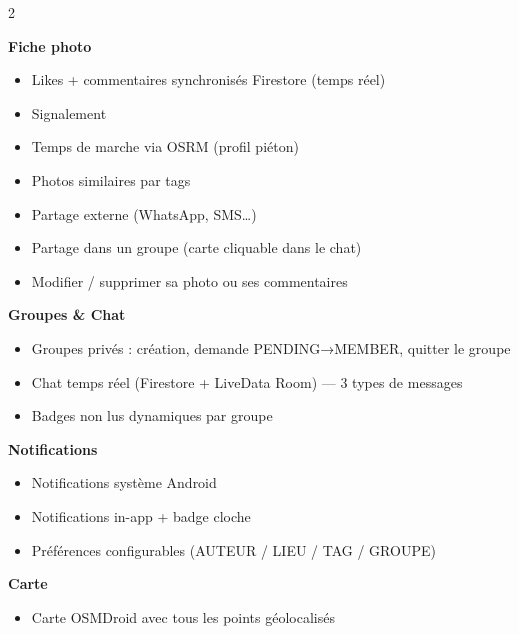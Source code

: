\documentclass[a4paper,12pt,openany]{report}
\begin{document}
\begin{tcolorbox}
\begin{multicols}{2}
\columnbreak

\textbf{Fiche photo}
\begin{itemize}[leftmargin=*,itemsep=0pt,topsep=2pt]
  \item Likes + commentaires synchronisés Firestore (temps réel)
  \item Signalement
  \item Temps de marche via OSRM (profil piéton)
  \item Photos similaires par tags
  \item Partage externe (WhatsApp, SMS…)
  \item Partage dans un groupe (carte cliquable dans le chat)
  \item Modifier / supprimer sa photo ou ses commentaires
\end{itemize}

\textbf{Groupes \& Chat}
\begin{itemize}[leftmargin=*,itemsep=0pt,topsep=2pt]
  \item Groupes privés : création, demande PENDING→MEMBER, quitter le groupe
  \item Chat temps réel (Firestore + LiveData Room) — 3 types de messages
  \item Badges non lus dynamiques par groupe
\end{itemize}

\textbf{Notifications}
\begin{itemize}[leftmargin=*,itemsep=0pt,topsep=2pt]
  \item Notifications système Android
  \item Notifications in-app + badge cloche
  \item Préférences configurables (AUTEUR / LIEU / TAG / GROUPE)
\end{itemize}

\textbf{Carte}
\begin{itemize}[leftmargin=*,itemsep=0pt,topsep=2pt]
  \item Carte OSMDroid avec tous les points géolocalisés
\end{itemize}
\end{multicols}
\end{tcolorbox}

\vspace{8pt}
\end{document}
